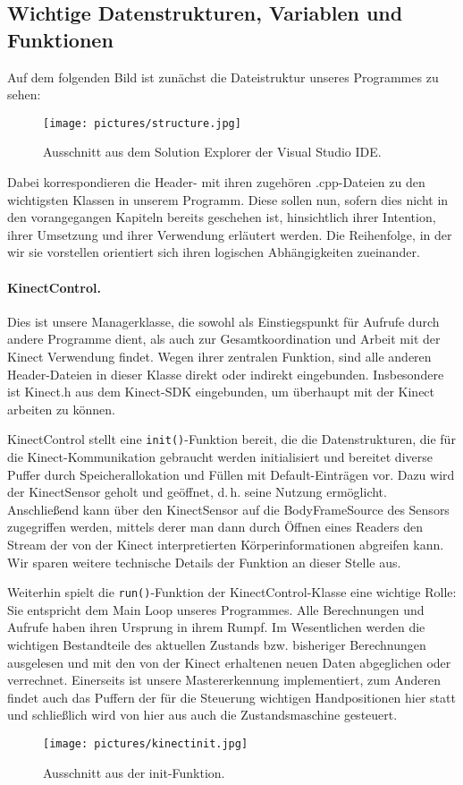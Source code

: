 	\subsection{Wichtige Datenstrukturen, Variablen und Funktionen}\label{sec:ds}
	Auf dem folgenden Bild ist zunächst die Dateistruktur unseres Programmes zu sehen:
	\begin{figure}[h]
	\centering
	\texttt{[image: pictures/structure.jpg]}
	\caption{Ausschnitt aus dem Solution Explorer der Visual Studio IDE.}
	\end{figure}
	Dabei korrespondieren die Header- mit ihren zugehören .cpp-Dateien zu den wichtigsten Klassen in unserem Programm. Diese sollen nun, sofern dies nicht in den vorangegangen Kapiteln bereits geschehen ist, hinsichtlich ihrer Intention, ihrer Umsetzung und ihrer Verwendung erläutert werden. Die Reihenfolge, in der wir sie vorstellen orientiert sich ihren logischen Abhängigkeiten zueinander.\par\medskip
	\paragraph{KinectControl.} Dies ist unsere Managerklasse, die sowohl als Einstiegspunkt für Aufrufe durch andere Programme dient, als auch zur Gesamtkoordination und Arbeit mit der Kinect Verwendung findet. Wegen ihrer zentralen Funktion, sind alle anderen Header-Dateien in dieser Klasse direkt oder indirekt eingebunden. Insbesondere ist Kinect.h aus dem Kinect-SDK eingebunden, um überhaupt mit der Kinect arbeiten zu können.\par 
	KinectControl stellt eine \texttt{init()}-Funktion bereit, die die Datenstrukturen, die für die Kinect-Kommunikation gebraucht werden initialisiert und bereitet diverse Puffer durch Speicherallokation und Füllen mit Default-Einträgen vor. Dazu wird der KinectSensor geholt und \glqq geöffnet\grqq{}, d.\,h. seine Nutzung ermöglicht. Anschließend kann über den KinectSensor auf die BodyFrameSource des Sensors zugegriffen werden, mittels derer man dann durch Öffnen eines Readers den Stream der von der Kinect interpretierten Körperinformationen abgreifen kann. Wir sparen weitere technische Details der Funktion an dieser Stelle aus.\par\smallskip
	Weiterhin spielt die \texttt{run()}-Funktion der KinectControl-Klasse eine wichtige Rolle: Sie entspricht dem \glqq Main Loop\grqq{} unseres Programmes. Alle Berechnungen und Aufrufe haben ihren Ursprung in ihrem Rumpf. Im Wesentlichen werden die wichtigen Bestandteile des aktuellen Zustands bzw. bisheriger Berechnungen ausgelesen und mit den von der Kinect erhaltenen neuen Daten abgeglichen oder verrechnet. Einerseits ist unsere Mastererkennung implementiert, zum Anderen findet auch das Puffern der für die Steuerung wichtigen Handpositionen hier statt und schließlich wird von hier aus auch die Zustandsmaschine gesteuert.\par
	\begin{figure}[h]
	\centering
	\texttt{[image: pictures/kinectinit.jpg]}
	\caption{Ausschnitt aus der init-Funktion.}
	\end{figure}
	\par\medskip
